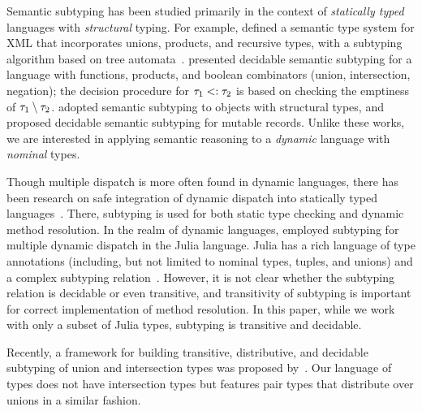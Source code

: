 Semantic subtyping has been studied primarily in the context of
\emph{statically typed} languages with \emph{structural} typing. 
For example, \citet{bib:Hosoya:2003:XDuce} defined 
a semantic type system for XML that incorporates unions, products,
and recursive types, with a subtyping algorithm based on tree 
automata~\cite{bib:Hosoya:2005:XML}.
\citet{bib:Frisch:2008:sem-sub} presented decidable semantic subtyping
for a language with functions, products, and boolean combinators 
(union, intersection, negation); the decision procedure 
for $\tau_1 <: \tau_2$ is based on checking
the emptiness of $\tau_1 \setminus \tau_2$. 
\citet{bib:Dardha:2013:semsub-oo} adopted semantic subtyping
to objects with structural types, and \citet{bib:Ancona:2016:sem-sub-oo} 
proposed decidable semantic subtyping for mutable records.
Unlike these works, we are interested in applying semantic reasoning
to a \emph{dynamic} language with \emph{nominal} types.

Though {multiple dispatch} is more often found in dynamic languages,
there has been research on safe integration of dynamic dispatch into
statically typed languages~\cite{bib:Chambers:1992:Cecil, 
Castagna:1992:COF:141471.141537, bib:Clifton:2000:MultiJava,
Park:2019:PSM:3302515.3290324}. There, subtyping is used for both
static type checking and dynamic method resolution.
In the realm of dynamic languages, \citet{Bezanson2015AbstractionIT} 
employed subtyping for multiple dynamic dispatch in the Julia language.
Julia has a rich language of type annotations 
(including, but not limited to nominal types, tuples, and unions) 
and a complex subtyping relation~\cite{ZappaNardelli:2018:JSR:3288538.3276483}. 
However, it is not clear whether the subtyping relation is decidable 
or even transitive, and transitivity of subtyping is important
for correct implementation of method resolution.
In this paper, while we work with only a subset of Julia types, 
subtyping is transitive and decidable.

Recently, a framework for building transitive, distributive,
and decidable subtyping of union and intersection types was proposed 
by~\citet{Muehlboeck:2018:EUI:3288538.3276482}.
Our language of types does not have intersection types but features
pair types that distribute over unions in a similar fashion.

